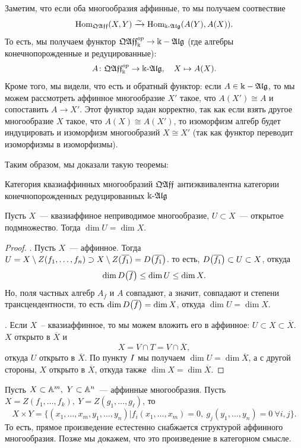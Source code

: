 	    Заметим, что если оба многообразия аффинные, то мы получаем соотвествие 
	    \[
	    	\Hom_{\qAff}(X, Y) \xrightarrow{\sim} \Hom_{\Bbbk\text{-}\Alg}(A(Y), A(X)).
	    \]
	    То есть, мы получаем функтор $\qAff^{op}_{\Bbbk} \to \Bbbk-\Alg$ (где алгебры конечнопорожденные и редуцированные):
	    \[
	    	A\colon \qAff^{op}_{\Bbbk} \to \Bbbk\text{-}\Alg, \quad X \mapsto A(X).
	    \]
	    Кроме того, мы видели, что есть и обратный функтор: если $A \in \Bbbk-\Alg$, то мы можем рассмотреть аффинное многообразие $X'$ такое, что $A(X') \cong A$ и сопоставить $A \to X'$. Этот функтор задан корректно, так как если взять другое многообразие $X$ такое, что $A(X) \cong A(X')$, то изоморфизм алгебр будет индуцировать и изоморфизм многообразий $X \cong X'$ (так как функтор переводит изоморфизмы в изоморфизмы). 

	    Таким образом, мы доказали такую теоремы: 
	    \begin{theorem} 
	    	Категория квазиаффинных многообразий $\qAff$ антиэквивалентна категории конечнопорожденных редуцированных $\Bbbk\text{-}\Alg$ 
	    \end{theorem}

	    \begin{statement} 
	    	Пусть $X$~--- квазиаффиное неприводимое многообразие, $U \subset X$~--- открытое подмножество. Тогда $\dim{U} = \dim{X}$.
	    \end{statement}
	    \begin{proof}
	    	. Пусть $X$~--- аффинное. Тогда $U = X \setminus Z(f_1, \ldots, f_n) \supset X \setminus Z(\overline{f_1}) = D\lr*{\overline{f_1}}$. то есть, $D\lr*{\overline{f_1}} \subset U \subset X$, откуда 
	    	\[
	    		\dim{D\lr*{\overline{f}}} \le \dim{U} \le \dim{X}. 
	    	\]
	    	Но, поля частных алгебр $A_{\overline{f}}$ и $A$ совпадают, а значит, совпадают и степени трансцендентности, то есть $\dim{D\lr*{\overline{f}}} = \dim{X}$, откуда $\dim{U} = \dim{X}$.

	    	. Если $X$~-- квазиаффинное, то мы можем вложить его в аффинное: $U \subset X \subset \overline{X}$. $X$ открыто в $\overline{X}$ и 
	    	\[
	    		X = V \cap T = V \cap \overline{X},
	    	\]
	    	откуда $U$ открыто в $\overline{X}$. По пункту $\RNum{1}$ мы получаем $\dim{U} = \dim{\overline{X}}$, а с другой стороны, $X$ открыто в $\overline{X}$, откуда также $\dim{X} = \dim{\overline{X}}$. 
	    \end{proof}

	    \begin{remark}
	    	Пусть $X \subset \AA^m, \ Y \subset \AA^n$~--- аффинные многообразия. Пусть $X = Z(f_1, \ldots, f_k), \ Y = Z(g_1, \ldots, g_{\ell})$, то 
	    	\[
	    		X \times Y = \{ (x_1, \ldots, x_m, y_1, \ldots, y_n) \vert f_i(x_1, \ldots, x_m) = 0, \ g_j(y_1, \ldots, y_n) = 0 \ \forall i, j \}.
	    	\]
	    	То есть, прямое произведение естестенно снабжается структурой аффинного многообразия. Позже мы докажем, что это произведение в категорном смысле. 
	    \end{remark}
	    	

